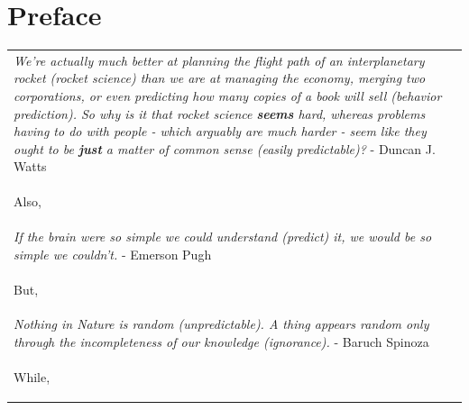 \documentclass[PhD]{iiitd}
\begin{document}


\setcounter{page}{1}



\chapter*{Preface}
\begin{table}[!th]
    \centering
    \begin{tabularx}{1\textwidth}{X}
        
        \textit{We're actually much better at planning the flight path of an interplanetary rocket (rocket science) than we are at managing the economy, merging two corporations, or even predicting how many copies of a book will sell (behavior prediction). So why is it that rocket science \textbf{seems} hard, whereas problems having to do with people - which arguably are much harder - seem like they ought to be \textbf{just} a matter of common sense (easily predictable)?} - Duncan J. Watts\\

        \begin{center}
                Also,
        \end{center}\\


        \textit{If the brain were so simple we could understand (predict) it, we would be so simple we couldn't.} - Emerson Pugh\\
        
        
        
        \begin{center}
            But,
        \end{center}\\
        
        \textit{Nothing in Nature is random (unpredictable). A thing appears random only through the incompleteness of our knowledge (ignorance).} - Baruch Spinoza\\

        \begin{center}
                While,
        \end{center}\\
        


\end{tabularx}
\end{table}
\end{document}
